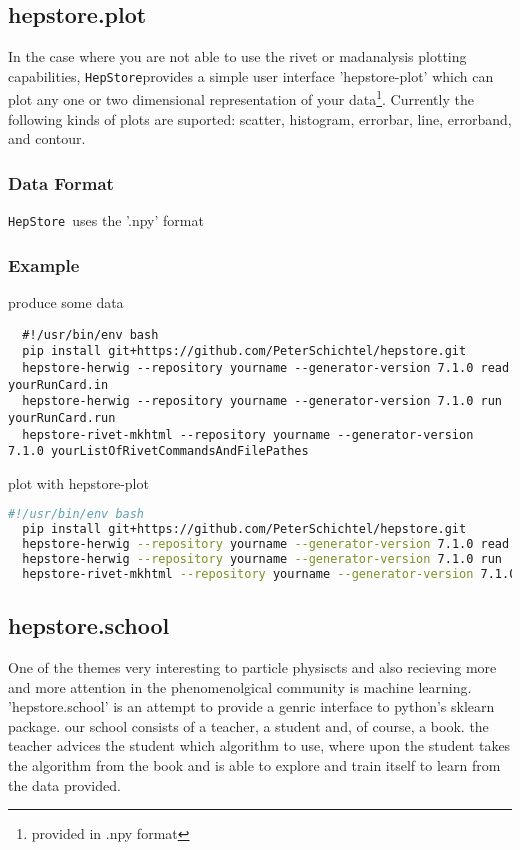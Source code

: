\documentclass[aps,prd,11pt,tightenlines,superscriptaddress,nofootinbib,preprintnumbers,notitlepage]{revtex4-1}
\newcommand{\hepstore}{\texttt{HepStore}}
\begin{document}
\subsection{hepstore.plot}

In the case where you are not able to use the rivet or madanalysis plotting capabilities, \hepstore provides a simple user interface 'hepstore-plot' which can plot any one or two dimensional representation of your data\footnote{provided in .npy format}. Currently the following kinds of plots are suported: scatter, histogram, errorbar, line, errorband, and contour.

\subsubsection{Data Format}

\hepstore~uses the '.npy' format

\subsubsection{Example}
produce some data
%
\begin{lstlisting}
  #!/usr/bin/env bash
  pip install git+https://github.com/PeterSchichtel/hepstore.git
  hepstore-herwig --repository yourname --generator-version 7.1.0 read yourRunCard.in
  hepstore-herwig --repository yourname --generator-version 7.1.0 run  yourRunCard.run
  hepstore-rivet-mkhtml --repository yourname --generator-version 7.1.0 yourListOfRivetCommandsAndFilePathes
\end{lstlisting}
%
plot with hepstore-plot
%
\begin{lstlisting}[language=Bash]
  #!/usr/bin/env bash
  pip install git+https://github.com/PeterSchichtel/hepstore.git
  hepstore-herwig --repository yourname --generator-version 7.1.0 read yourRunCard.in
  hepstore-herwig --repository yourname --generator-version 7.1.0 run  yourRunCard.run
  hepstore-rivet-mkhtml --repository yourname --generator-version 7.1.0 yourListOfRivetCommandsAndFilePathes
\end{lstlisting}
%
\subsection{hepstore.school}

One of the themes very interesting to particle physiscts and also recieving more and more attention in the phenomenolgical community is machine learning. 'hepstore.school' is an attempt to provide a genric interface to python's sklearn package. our school consists of a teacher, a student and, of course, a book. the teacher advices the student which algorithm to use, where upon the student takes the algorithm from the book and is able to explore and train itself to learn from the data provided.
\end{document}

